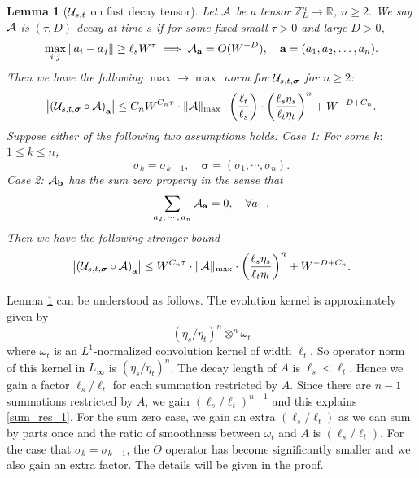 \documentclass[10pt,reqno]{article}
\theoremstyle{plain} %
\newtheorem{lemma}[theorem]{Lemma}
\theoremstyle{remark}
\numberwithin{equation}{section}
\begin{document}
\begin{lemma}[${\cal U}_{s,t}$ on fast decay tensor]\label{lem:sum_decay}
Let $\cal A$ be a tensor $\mathbb Z_L^n\to \mathbb R$, $n\ge 2$. We say $\cal A$ is $(\tau, D)$ decay at time $s$ if  for some fixed small $\tau>0$ and large $D>0$,   
\begin{equation}\label{deccA0}
    \max_{i,j}\|a_i-a_j\|\ge \ell_s W^{\tau} \implies  {\cal A}_{\textbf{a}}=O(W^{-D}),\quad \textbf{a}=(a_1,a_2,\ldots,a_n) .
\end{equation}
Then we have the following $\max\to \max$ norm for ${\cal U}_{s,t,\boldsymbol{\sigma}}$ for  $n\ge 2$: 
\begin{align}\label{sum_res_1}
    \left|\left({\cal U}_{s,t,\boldsymbol{\sigma}} \circ {\cal A}\right)_\textbf{a}\right| \le C_n W^{C_n\tau}\cdot   \|{\cal A}\|_{\max}
    \cdot \left(\frac{\ell_t}{\ell_s}\right) 
    \cdot \left(\frac{\ell_s\eta_s}{\ell_t\eta_t}\right)^{n} +W^{-D+C_n}.
\end{align}
Suppose either of the following two assumptions holds: 
Case 1: For some $k:$ $1\le k\le n$,  
$$ 
\sigma_k=\sigma_{k-1}, \quad \boldsymbol{\sigma}=(\sigma_1,\cdots, \sigma_n).
$$
Case 2: ${\cal A}_{\textbf{b}}$ has the sum zero property in the sense that 
\begin{align}\label{sumAzero}
 \sum_{a_2,\,\cdots,\, a_n}{\cal A}_{\textbf{a}}=0, \quad \forall a_1 \; .
\end{align}
Then we have the following  stronger bound %
\begin{align}\label{sum_res_2}
    \left|\left({\cal U}_{s,t,\boldsymbol{\sigma}} \circ {\cal A}\right)_\textbf{a}\right| \le W^{C_n\tau}\cdot   \|{\cal A}\|_{\max} 
    \cdot \left(\frac{\ell_s\eta_s}{\ell_t\eta_t}\right)^{n } +W^{-D+C_n}. 
\end{align} 
\end{lemma} 

Lemma \ref{lem:sum_decay} can be understood as follows. The evolution kernel is approximately given by 
\[
(\eta_s/\eta_t)^n  {\otimes^n}   \omega_{t}
\]
where $\omega_{t}$ is an $L^1$-normalized convolution kernel of width $\ell_t$. 
So operator norm of this kernel in $L_\infty$ is $(\eta_s/\eta_t)^n $.  The decay length of 
$A$ is $ \ell_s < \ell_t$. Hence we gain a factor $\ell_s/\ell_t$ for each summation restricted by $A$. Since there are $n-1$ summations restricted by $A$, we gain $ (\ell_s/\ell_t)^{n-1}$
and this explains \eqref{sum_res_1}. For the sum zero case, we gain an extra 
$(\ell_s/\ell_t)$ as we can sum by parts once  and the ratio of smoothness between $\omega_t$ and $A$ is $(\ell_s/\ell_t)$. For the case that  $\sigma_k=\sigma_{k-1}$, the $\Theta$ operator has become significantly smaller and we also gain  an extra factor. The details will be given in the proof. 
\end{document}
